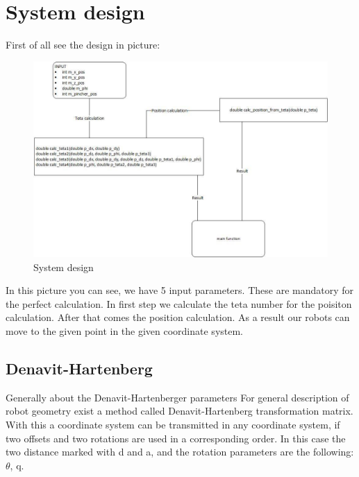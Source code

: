 \chapter{System design} \label{ch:sys_design}

	\hspace{15pt}First of all see the design in picture:

		\begin{figure}[H]
			\centering
			\includegraphics[width=\textwidth]{./images/system_design}
			\caption{System design}
		\end{figure}

	In this picture you can see, we have 5 input parameters. These are mandatory for the perfect calculation. In first step we calculate the teta number for the poisiton calculation. After that comes the position calculation. As a result our robots can move to the given point in the given coordinate system.
	
	\section{Denavit-Hartenberg}

	\hspace{15pt}Generally about the Denavit-Hartenberger parameters
For general description of robot geometry exist a method called Denavit-Hartenberg transformation matrix. With this a coordinate system can be transmitted in any coordinate system, if two offsets and two rotations are used in a corresponding order. In this case the two distance marked with d and a, and the rotation parameters are the following: $\theta$, q. \\



